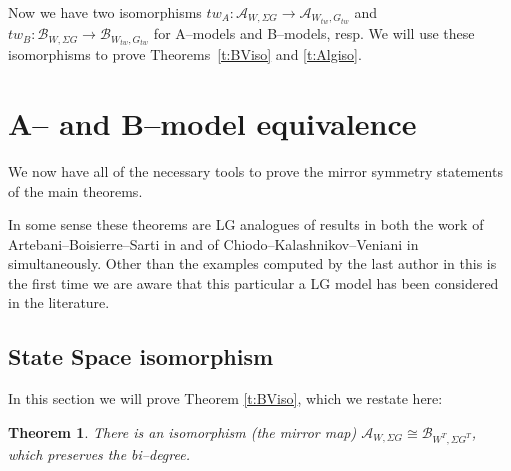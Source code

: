 \documentclass[10pt, letterpaper]{amsart}
\newtheorem{thm}{Theorem}%
\theoremstyle{remark}
\newcommand{\sA}{\mathscr{A}}
\newcommand{\sB}{\mathscr{B}}
\newcommand{\tw}[1]{{#1}_{tw}}
\newcommand{\s}[1]{\Sigma #1}
\begin{document}
Now we have two isomorphisms $tw_A:\sA_{W,\s G}\to \sA_{\tw W,\tw G}$ and $tw_B:\sB_{W,\s G}\to \sB_{\tw W,\tw G}$ for A--models and 
B--models, resp. We will use these isomorphisms to prove Theorems~\ref{t:BViso} and \ref{t:Algiso}. 









\section{A-- and B--model equivalence}\label{e:BVLGABmodeliso}
We now have all of the necessary tools to prove the mirror symmetry statements of the main theorems. 

In some sense these theorems are LG analogues of results in both the work of Artebani--Boisierre--Sarti in \cite{ABS} and of Chiodo--Kalashnikov--Veniani in \cite{CKV} simultaneously. Other than the examples computed by the last author in \cite{Schaug} this is the first time we are aware that this particular a LG model has been considered in the literature. 

\subsection{State Space isomorphism}\label{s:twistedstatespaceisom}
In this section we will prove Theorem \ref{t:BViso}, which we restate here:
\begin{thm}\label{t:thm1}\label{t:BViso}
There is an isomorphism (the mirror map) $\sA_{W,\s{G}}\cong \sB_{W^T,\s{G^T}}$, which preserves the bi--degree. 
\end{thm} 
\end{document}
